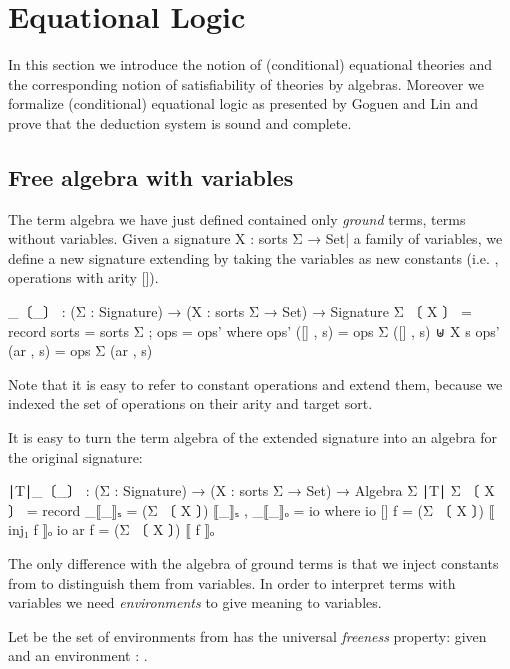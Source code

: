 \section{Equational Logic}
\label{sec:eqlog}

In this section we introduce the notion of (conditional) equational
theories and the corresponding notion of satisfiability of theories
by algebras. Moreover we formalize (conditional) equational logic as
presented by Goguen and Lin \cite{goguen2005specifying} and prove that
the deduction system is sound and complete.

\subsection{Free algebra with variables}
The term algebra we have just defined contained only \emph{ground}
terms, \ie terms without variables. Given a signature X :
sorts Σ → Set| a family of variables, we define a new signature
extending  by taking the variables as new constants
(i.e. , operations with arity []).
\begin{spec}
  _〔_〕 : (Σ : Signature) → (X : sorts Σ → Set) → Signature
  Σ 〔 X 〕 = record  { sorts = sorts Σ ; ops =  ops' }
     where   ops' ([] , s)   = ops Σ ([] , s) ⊎ X s
             ops' (ar , s)   = ops Σ (ar , s)
\end{spec}%
\noindent Note that it is easy to refer to constant operations and
extend them, because we indexed the set of operations on their arity
and target sort.

It is easy to turn the term algebra of the extended signature
into an algebra for the original signature:
\begin{spec}
∣T∣_〔_〕 : (Σ : Signature) → (X : sorts Σ → Set) → Algebra Σ
∣T∣ Σ 〔 X 〕  = record { _⟦_⟧ₛ =  (Σ 〔 X 〕) ⟦_⟧ₛ , _⟦_⟧ₒ = io }
  where  io {[]}  f  =  (Σ 〔 X 〕) ⟦ inj₁ f ⟧ₒ
         io {ar}  f  =  (Σ 〔 X 〕) ⟦ f ⟧ₒ
\end{spec}
\noindent The only difference with the algebra of ground terms is that
we inject constants from  to distinguish them from variables. In
order to interpret terms with variables we need \emph{environments} to
give meaning to variables.

Let  be the set of
environments from  has the
universal \emph{freeness} property: given  and an
environment  :
.

